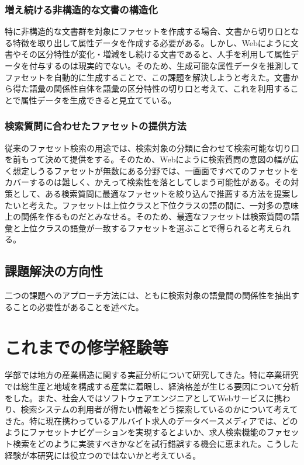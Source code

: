 \documentclass[a4j,10pt, twocolumn]{jarticle}
\begin{document}
\subsubsection{増え続ける非構造的な文書の構造化}
 特に非構造的な文書群を対象にファセットを作成する場合、文書から切り口となる特徴を取り出して属性データを作成する必要がある。しかし、Webにように文書やその区分特性が変化・増減をし続ける文書であると、人手を利用して属性データを付与するのは現実的でない。そのため、生成可能な属性データを推測してファセットを自動的に生成することで、この課題を解決しようと考えた。文書から得た語彙の関係性自体を語彙の区分特性の切り口と考えて、これを利用することで属性データを生成できると見立てている。
\subsubsection{検索質問に合わせたファセットの提供方法}
従来のファセット検索の用途では、検索対象の分類に合わせて検索可能な切り口を前もって決めて提供をする。そのため、Webにように検索質問の意図の幅が広く想定しうるファセットが無数にある分野では、一画面ですべてのファセットをカバーするのは難しく、かえって検索性を落としてしまう可能性がある。その対策として、ある検索質問に最適なファセットを絞り込んで推薦する方法を提案したいと考えた。ファセットは上位クラスと下位クラスの語の間に、一対多の意味上の関係を作るものだとみなせる。そのため、最適なファセットは検索質問の語彙と上位クラスの語彙が一致するファセットを選ぶことで得られると考えられる。

\subsection{課題解決の方向性}
二つの課題へのアプローチ方法には、ともに検索対象の語彙間の関係性を抽出することの必要性があることを述べた。

\section{これまでの修学経験等}
 学部では地方の産業構造に関する実証分析について研究してきた。特に卒業研究では総生産と地域を構成する産業に着眼し、経済格差が生じる要因について分析をした。また、社会人ではソフトウェアエンジニアとしてWebサービスに携わり、検索システムの利用者が得たい情報をどう探索しているのかについて考えてきた。特に現在携わっているアルバイト求人のデータベースメディアでは、どのようにファセットナビゲーションを実現するとよいか、求人検索機能のファセット検索をどのように実装すべきかなどを試行錯誤する機会に恵まれた。こうした経験が本研究には役立つのではないかと考えている。
\end{document}
